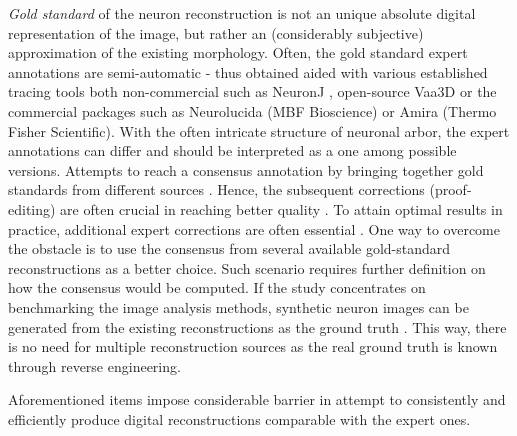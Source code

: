 \textit{Gold standard} of the neuron reconstruction is not an unique absolute digital representation of the image, but rather an (considerably subjective) approximation of the existing morphology. Often, the gold standard expert annotations are semi-automatic - thus obtained aided with various established tracing tools \cite{ascoli2007neuromorpho} both non-commercial such as NeuronJ \cite{meijering2004design}, open-source Vaa3D \cite{peng2014extensible} or the commercial packages such as Neurolucida (MBF Bioscience) or Amira (Thermo Fisher Scientific). With the often intricate structure of neuronal arbor, the expert annotations can differ and should be interpreted as a one among possible versions. Attempts to reach a consensus annotation by bringing together gold standards from different sources \cite{peng2015bigneuron}. Hence, the subsequent corrections (proof-editing) are often crucial in reaching better quality \cite{peng2011proof}. To attain optimal results in practice, additional expert corrections are often essential \cite{peng2011proof}. One way to overcome the obstacle is to use the consensus from several available gold-standard reconstructions as a better choice. Such scenario requires further definition on how the consensus would be computed. If the study concentrates on benchmarking the image analysis methods, synthetic neuron images can be generated from the existing reconstructions as the ground truth \cite{koene2009netmorph, radojevic2015fuzzy, radojevic-pnr}. This way, there is no need for multiple reconstruction sources as the real ground truth is known through reverse engineering.

Aforementioned items impose considerable barrier in attempt to consistently and efficiently produce digital reconstructions comparable with the expert ones.

